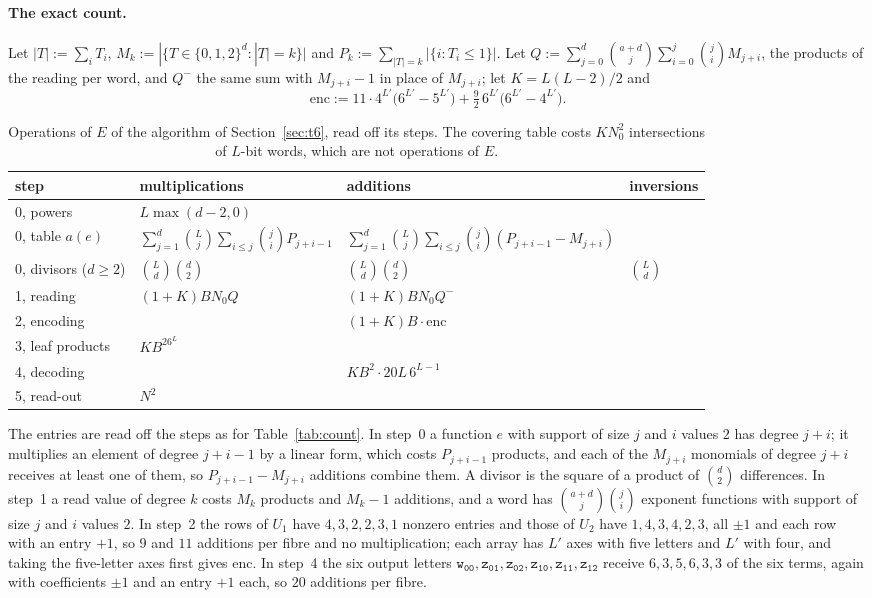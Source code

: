 \documentclass[11pt]{article}
\theoremstyle{definition}
\theoremstyle{remark}
\newcommand{\Nz}{N_0}
\newcommand{\tl}[1]{\mathtt{#1}}
\begin{document}
\paragraph{The exact count.} Let $|T|:=\sum_iT_i$, $M_k:=|\{T\in\{0,1,2\}^d:|T|=k\}|$ and $P_k:=\sum_{|T|=k}|\{i:T_i\le1\}|$. Let $Q:=\sum_{j=0}^d\binom{a+d}j\sum_{i=0}^j\binom jiM_{j+i}$, the products of the reading per word, and $Q^-$ the same sum with $M_{j+i}-1$ in place of $M_{j+i}$; let $K=L(L-2)/2$ and
\[
\mathrm{enc}:=11\cdot4^{L'}\bigl(6^{L'}-5^{L'}\bigr)+\tfrac92\,6^{L'}\bigl(6^{L'}-4^{L'}\bigr).
\]

\begin{table}[ht]
\centering\small
\renewcommand{\arraystretch}{1.25}
\begin{tabular}{@{}llll@{}}
\toprule
step & multiplications & additions & inversions\\
\midrule
0, powers & $L\max(d-2,0)$ & & \\
0, table $a(e)$ & $\sum_{j=1}^d\binom Lj\sum_{i\le j}\binom jiP_{j+i-1}$ & $\sum_{j=1}^d\binom Lj\sum_{i\le j}\binom ji(P_{j+i-1}-M_{j+i})$ & \\
0, divisors ($d\ge2$) & $\binom Ld\binom d2$ & $\binom Ld\binom d2$ & $\binom Ld$\\
1, reading & $(1+K)B\Nz Q$ & $(1+K)B\Nz Q^-$ & \\
2, encoding & & $(1+K)B\cdot\mathrm{enc}$ & \\
3, leaf products & $KB^26^L$ & & \\
4, decoding & & $KB^2\cdot20L\,6^{L-1}$ & \\
5, read-out & $N^2$ & & \\
\bottomrule
\end{tabular}
\caption{Operations of $E$ of the algorithm of Section~\ref{sec:t6}, read off its steps. The covering table costs $K\Nz^2$ intersections of $L$-bit words, which are not operations of $E$.}\label{tab:count6}
\end{table}

The entries are read off the steps as for Table~\ref{tab:count}. In step~0 a function $e$ with support of size $j$ and $i$ values $2$ has degree $j+i$; it multiplies an element of degree $j+i-1$ by a linear form, which costs $P_{j+i-1}$ products, and each of the $M_{j+i}$ monomials of degree $j+i$ receives at least one of them, so $P_{j+i-1}-M_{j+i}$ additions combine them. A divisor is the square of a product of $\binom d2$ differences. In step~1 a read value of degree $k$ costs $M_k$ products and $M_k-1$ additions, and a word has $\binom{a+d}j\binom ji$ exponent functions with support of size $j$ and $i$ values $2$. In step~2 the rows of $U_1$ have $4,3,2,2,3,1$ nonzero entries and those of $U_2$ have $1,4,3,4,2,3$, all $\pm1$ and each row with an entry $+1$, so $9$ and $11$ additions per fibre and no multiplication; each array has $L'$ axes with five letters and $L'$ with four, and taking the five-letter axes first gives $\mathrm{enc}$. In step~4 the six output letters $\tl{w_{00}},\tl{z_{01}},\tl{z_{02}},\tl{z_{10}},\tl{z_{11}},\tl{z_{12}}$ receive $6,3,5,6,3,3$ of the six terms, again with coefficients $\pm1$ and an entry $+1$ each, so $20$ additions per fibre.
\end{document}
